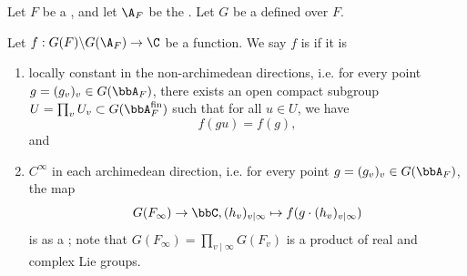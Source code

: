 \begin{definition} \label{definition:smooth_function_on_the_adelic_quotient_group_of_a_linear_algebraic_group_over_a_global_field}
    Let $F$ be a , and let $\A_F$ be the . Let $G$ be a  defined over $F$. 

    Let $f: G(F) \backslash G(\A_F) \to \C$ be a function. We say $f$ is  if it is 
    \begin{enumerate}
        \item locally constant in the non-archimedean directions, i.e. for every point $g = (g_v)_v \in G(\bbA_F)$, there exists an open compact subgroup $U = \prod_v U_v \subset G(\bbA_F^{\mathrm{fin}})$ such that for all $u \in U$, we have 
        $$f(gu) = f(g),$$
        and
        \item $C^\infty$ in each archimedean direction, i.e. for every point $g = (g_v)_v \in G(\bbA_F)$, the map 
        $$G(F_\infty) \to \bbC, (h_v)_{v \mid \infty} \mapsto f(g \cdot(h_v)_{v \mid \infty})$$
        is  as a ; note that $G(F_\infty) = \prod_{v \mid \infty} G(F_v)$ is a product of real and complex Lie groups.
    \end{enumerate}
\end{definition}